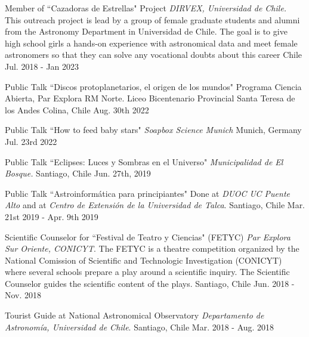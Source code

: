 
\vspace{10pt}

\begin{cvhonors}
	
		\cvhonor
	{Member of ``Cazadoras de Estrellas" Project} %
	{\textit{DIRVEX, Universidad de Chile. }This outreach project is lead by a group of female graduate students and alumni from the Astronomy Department in Universidad de Chile. The goal is to give high school girls a hands-on experience with astronomical data and meet female astronomers so that they can solve any vocational doubts about this career} 
	{Chile} %
	{Jul. 2018 - Jan 2023} %
	
	\cvhonor
	{Public Talk ``Discos protoplanetarios, el origen de los mundos"} %
	{Programa Ciencia Abierta, Par Explora RM Norte. Liceo Bicentenario Provincial Santa Teresa de los Andes}
	{Colina, Chile} %
	{Aug. 30th 2022} %
	
	\cvhonor
	{Public Talk ``How to feed baby stars"} %
	{\textit{Soapbox Science Munich}} 
	{Munich, Germany} %
	{Jul. 23rd 2022} %

	
	\cvhonor
	{Public Talk ``Eclipses: Luces y Sombras en el Universo"} %
	{\textit{Municipalidad de El Bosque.} } 
	{Santiago, Chile} %
	{Jun. 27th, 2019} %

	\cvhonor
	{Public Talk ``Astroinform\'atica para principiantes"} %
	{Done at \textit{DUOC UC Puente Alto} and at \textit{Centro de Extensi\'on de la Universidad de Talca}. } 
	{Santiago, Chile} %
	{Mar. 21st 2019 - Apr. 9th 2019} %
	
	\cvhonor
	{Scientific Counselor for ``Festival de Teatro y Ciencias" (FETYC)} %
	{\textit{Par Explora Sur Oriente, CONICYT}. The FETYC is a theatre competition organized by the National Comission of Scientific and Technologic Investigation (CONICYT) where several schools prepare a play around a scientific inquiry. The Scientific Counselor guides the scientific content of the plays.} 
	{Santiago, Chile} %
	{Jun. 2018 - Nov. 2018} %
	
	\cvhonor
	{Tourist Guide at National Astronomical Observatory} %
	{\textit{Departamento de Astronom\'ia, Universidad de Chile}. } 
	{Santiago, Chile} %
	{Mar. 2018 - Aug. 2018} %
	
\end{cvhonors}